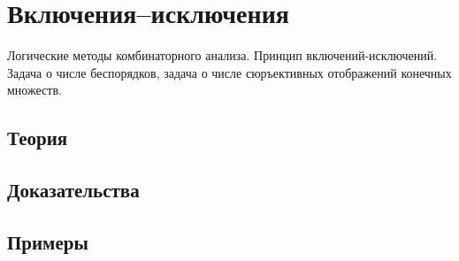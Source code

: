 
\section{Включения–исключения}
\label{sec:2.2.05-inclusion-exclusion}

\begin{ticket}
Логические методы комбинаторного анализа. Принцип включений-исключений. Задача о числе беспорядков, задача о числе сюръективных отображений конечных множеств.
\end{ticket}

\subsection*{Теория}

\subsection*{Доказательства}

\subsection*{Примеры}
